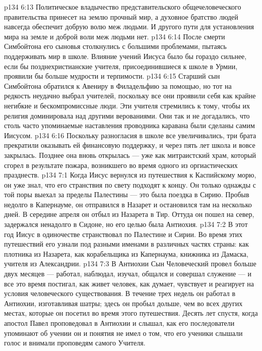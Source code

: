\vs p134 6:13 Политическое владычество представительского общечеловеческого правительства принесет на землю прочный мир, а духовное братство людей навсегда обеспечит добрую волю меж людьми. И другого пути для установления мира на земле и доброй воли меж людьми нет.
\separatorline
\vs p134 6:14 После смерти Симбойтона его сыновья столкнулись с большими проблемами, пытаясь поддерживать мир в школе. Влияние учений Иисуса было бы гораздо сильнее, если бы позднехристианские учителя, присоединившиеся к школе в Урмии, проявили бы больше мудрости и терпимости.
\vs p134 6:15 Старший сын Симбойтона обратился к Авениру в Филадельфию за помощью, но тот на редкость неудачно выбрал учителей, поскольку все они проявили себя как крайне негибкие и бескомпромиссные люди. Эти учителя стремились к тому, чтобы их религия доминировала над другими верованиями. Они так и не догадались, что столь часто упоминаемые наставления проводника каравана были сделаны самим Иисусом.
\vs p134 6:16 Поскольку разногласия в школе все увеличивались, три брата прекратили оказывать ей финансовую поддержку, и через пять лет школа и вовсе закрылась. Позднее она вновь открылась --- уже как митраистский храм, который сгорел в результате пожара, возникшего во время одного из оргиастических празднеств.
\vs p134 7:1 Когда Иисус вернулся из путешествия к Каспийскому морю, он уже знал, что его странствия по свету подходят к концу. Он только однажды с той поры выехал за пределы Палестины --- это была поездка в Сирию. Пробыв недолго в Капернауме, он отправился в Назарет и остановился там на несколько дней. В середине апреля он отбыл из Назарета в Тир. Оттуда он пошел на север, задержался ненадолго в Сидоне, но его целью была Антиохия.
\vs p134 7:2 В этот год Иисус в одиночестве странствовал по Палестине и Сирии. Во время этих путешествий его узнали под разными именами в различных частях страны: как плотника из Назарета, как корабельщика из Капернаума, книжника из Дамаска, учителя из Александрии.
\vs p134 7:3 В Антиохии Сын Человеческий провел больше двух месяцев --- работал, наблюдал, изучал, общался и совершал служение --- и все это время постигал, как живет человек, как думает, чувствует и реагирует на условия человеческого существования. В течение трех недель он работал в Антиохии, изготавливая шатры; здесь он пробыл дольше, чем во всех других местах, которые он посетил во время этого путешествия. Десять лет спустя, когда апостол Павел проповедовал в Антиохии и слышал, как его последователи упоминают об учении  он и понятия не имел о том, что его ученики слышали голос и внимали проповедям самого Учителя.
